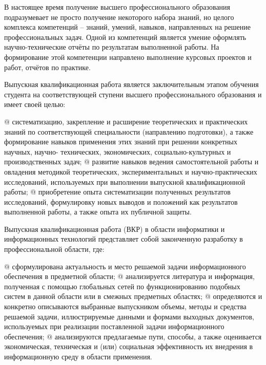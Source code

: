 
\usepackage{framed}




В настоящее время получение высшего профессионального образования подразумевает
не просто получение некоторого набора знаний, но целого комплекса компетенций – знаний,
умений, навыков, направленных на решение профессиональных задач. Одной из компетенций
является умение оформлять научно-технические отчёты по результатам выполненной работы.
На формирование этой компетенции направлено выполнение курсовых проектов и работ,
отчётов по практике.

Выпускная квалификационная работа является заключительным этапом обучения
студента на соответствующей ступени высшего профессионального образования и имеет своей
целью:
\begin{easylist}\NewList\bullist
	@ систематизацию, закрепление и расширение теоретических и практических знаний по
	соответствующей специальности (направлению подготовки), а также формирование
	навыков применения этих знаний при решении конкретных научных, научно-
	технических, экономических, социально-культурных и производственных задач;
	@ развитие навыков ведения самостоятельной работы и овладения методикой
	теоретических, экспериментальных и научно-практических исследований,
	используемых при выполнении выпускной квалификационной работы;
	@ приобретение опыта систематизации полученных результатов исследований,
	формулировку новых выводов и положений как результатов выполненной работы, а
	также опыта их публичной защиты.
\end{easylist}

Выпускная квалификационная работа (ВКР) в области информатики и информационных
технологий представляет собой законченную разработку в профессиональной области, где:

\begin{easylist} \bullist
	@ сформулирована актуальность и место решаемой задачи информационного обеспечения 
	в предметной области;
	@ анализируется литература и информация, полученная с помощью глобальных сетей
	по функционированию подобных систем в данной области или в смежных
	предметных областях;
	@ определяются и конкретно описываются выбранные выпускником объемы, методы и
	средства решаемой задачи, иллюстрируемые данными и формами выходных
	документов, используемых при реализации поставленной задачи информационного
	обеспечения;
	@ анализируются предлагаемые пути, способы, а также оценивается экономическая,
	техническая и (или) социальная эффективность их внедрения в информационную
	среду в области применения.
\end{easylist}

